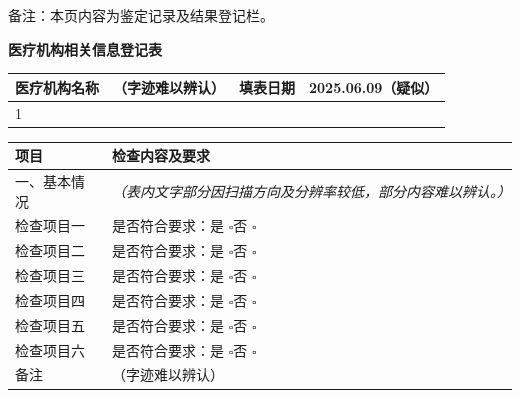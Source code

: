 \documentclass[UTF8,10pt,a4paper,fontset=fandol]{ctexart}
\newcommand{\fieldvalue}[1]{#1}
\newcommand{\handwritten}[1]{#1}
\begin{document}
\vspace{1em}

\noindent
备注：本页内容为鉴定记录及结果登记栏。%

\newpage

\begin{center}
\textbf{医疗机构相关信息登记表}
\end{center}

\begin{tabularx}{\textwidth}{|l|X|l|X|}
\hline
医疗机构名称 & 
\fieldvalue{\handwritten{（字迹难以辨认）}} &
填表日期 &
\fieldvalue{\handwritten{2025.06.09（疑似）}} \\
\hline
\multicolumn{4}{|l|}{
\fieldvalue{1}
} \\
\hline
\end{tabularx}

\vspace{0.5em}

\begin{tabularx}{\textwidth}{|p{}|X|}
\hline
项目 & 检查内容及要求 \\
\hline
一、基本情况 &
\textit{（表内文字部分因扫描方向及分辨率较低，部分内容难以辨认。）} \\
\hline
检查项目一 &
是否符合要求：\quad 是 $\square$\quad 否 $\square$ \\
\hline
检查项目二 &
是否符合要求：\quad 是 $\square$\quad 否 $\square$ \\
\hline
检查项目三 &
是否符合要求：\quad 是 $\square$\quad 否 $\square$ \\
\hline
检查项目四 &
是否符合要求：\quad 是 $\square$\quad 否 $\square$ \\
\hline
检查项目五 &
是否符合要求：\quad 是 $\square$\quad 否 $\square$ \\
\hline
检查项目六 &
是否符合要求：\quad 是 $\square$\quad 否 $\square$ \\
\hline
备注 &
\fieldvalue{\handwritten{（字迹难以辨认）}} \\
\hline
\end{tabularx}

\vspace{0.5em}
\end{document}
